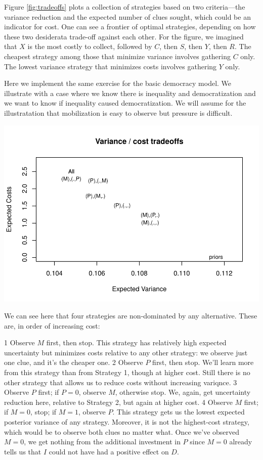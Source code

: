 \documentclass[
  12pt,
]{book}
\begin{document}
Figure \ref{fig:tradeoffs} plots a collection of strategies based on two criteria---the variance reduction and the expected number of clues sought, which could be an indicator for cost. One can see a frontier of optimal strategies, depending on how these two desiderata trade-off against each other. For the figure, we imagined that \(X\) is the most costly to collect, followed by \(C\), then \(S\), then \(Y\), then \(R\). The cheapest strategy among those that minimize variance involves gathering \(C\) only. The lowest variance strategy that minimizes costs involves gathering \(Y\) only.

Here we implement the same exercise for the basic democracy model. We illustrate with a case where we know there is inequality and democratization and we want to know if inequality caused democratization. We will assume for the illustratation that mobilization is easy to observe but pressure is difficult.

\includegraphics{ii_files/figure-latex/strategies-1.pdf}

We can see here that four strategies are non-dominated by any alternative. These are, in order of increasing cost:

1 Observe \(M\) first, then stop. This strategy has relatively high expected uncertainty but minimizes costs relative to any other strategy: we observe just one clue, and it's the cheaper one.
2 Observe \(P\) first, then stop. We'll learn more from this strategy than from Strategy 1, though at higher cost. Still there is no other strategy that allows us to reduce costs without increasing variqnce.
3 Observe \(P\) first; if \(P=0\), observe \(M\), otherwise stop. We, again, get uncertainty reduction here, relative to Strategy 2, but again at higher cost.
4 Observe \(M\) first; if \(M=0\), stop; if \(M=1\), observe \(P\). This strategy gets us the lowest expected posterior variance of any strategy. Moreover, it is not the highest-cost strategy, which would be to observe both clues no matter what. Once we've observed \(M=0\), we get nothing from the additional investment in \(P\) since \(M=0\) already tells us that \(I\) could not have had a positive effect on \(D\).
\end{document}
